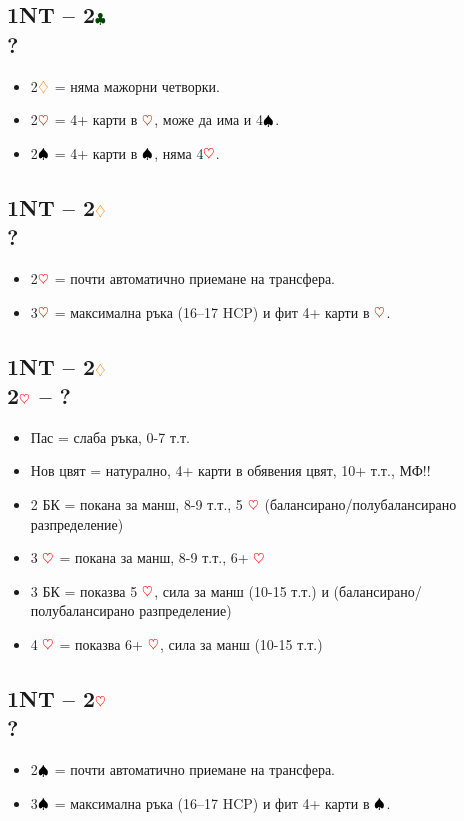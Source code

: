 \documentclass[10pt,a5paper]{extarticle}
\newcommand{\Rheart}{\textcolor{red}{\heartsuit}}
\newcommand{\Rdiamond}{\textcolor{orange}{\diamondsuit}}
\newcommand{\Bspade}{\textcolor{black}{\spadesuit}}
\newcommand{\Bclub}{\textcolor{darkgreen}{\clubsuit}}
\begin{document}
\subsection*{1NT – 2$\Bclub$\\?}
\begin{itemize}
    \item[] 2$\Rdiamond$ = няма мажорни четворки.
    \item[] 2$\Rheart$ = 4+ карти в $\Rheart$, може да има и 4$\Bspade$.
    \item[] 2$\Bspade$ = 4+ карти в $\Bspade$, няма 4$\Rheart$.
\end{itemize}

\subsection*{1NT – 2$\Rdiamond$\\?}
\begin{itemize}
    \item[] 2$\Rheart$ = почти автоматично приемане на трансфера.
    \item[] 3$\Rheart$ = максимална ръка (16–17 HCP) и фит 4+ карти в $\Rheart$.
\end{itemize}

\subsection*{1NT – 2$\Rdiamond$\\2$\Rheart$ – ?}
\begin{itemize}
    \item[] Пас = слаба ръка, 0-7 т.т.
    \item[] Нов цвят = натурално, 4+ карти в обявения цвят, 10+ т.т., МФ!!
    \item[] 2 БК = покана за манш, 8-9 т.т., 5 $\Rheart$ (балансирано/полубалансирано разпределение)
    \item[] 3 $\Rheart$ = покана за манш, 8-9 т.т., 6+ $\Rheart$
    \item[] 3 БК = показва 5 $\Rheart$, сила за манш (10-15 т.т.) и (балансирано/полубалансирано разпределение)
    \item[] 4 $\Rheart$  = показва 6+ $\Rheart$, сила за манш (10-15 т.т.)
\end{itemize}

\subsection*{1NT – 2$\Rheart$\\?}
\begin{itemize}
    \item[] 2$\Bspade$ = почти автоматично приемане на трансфера.
    \item[] 3$\Bspade$ = максимална ръка (16–17 HCP) и фит 4+ карти в $\Bspade$.
\end{itemize}
\end{document}
